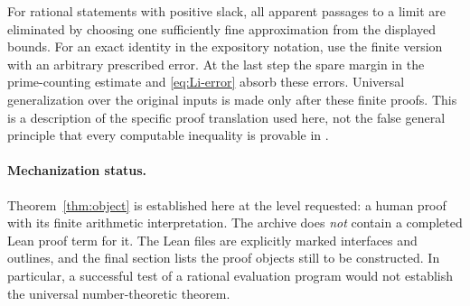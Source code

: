 For rational statements with positive slack, all apparent passages to
a limit are eliminated by choosing one sufficiently fine approximation
from the displayed bounds. For an exact identity in the expository
notation, use the finite version with an arbitrary prescribed error.
At the last step the spare margin in the prime-counting estimate and
\eqref{eq:Li-error} absorb these errors. Universal generalization over
the original inputs is made only after these finite proofs. This is a
description of the specific proof translation used here, not the false
general principle that every computable inequality is provable in \ipra.

\paragraph{Mechanization status.}
Theorem~\ref{thm:object} is established here at the level requested: a
human proof with its finite arithmetic interpretation. The archive does
\emph{not} contain a completed Lean proof term for it. The Lean files are
explicitly marked interfaces and outlines, and the final section lists
the proof objects still to be constructed. In particular, a successful
test of a rational evaluation program would not establish the universal
number-theoretic theorem.
